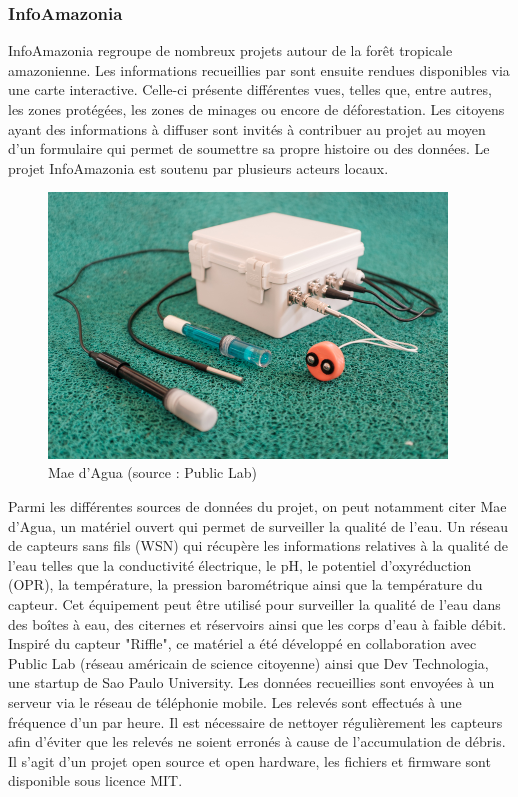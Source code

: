 \documentclass[10pt, article]{llncs}
\begin{document}
		\subsubsection{InfoAmazonia}
			InfoAmazonia regroupe de nombreux projets autour de la forêt tropicale amazonienne. Les informations recueillies par sont ensuite rendues disponibles via une carte interactive. Celle-ci présente différentes vues, telles que, entre autres, les zones protégées, les zones de minages ou encore de déforestation. Les citoyens ayant des informations à diffuser sont invités à contribuer au projet au moyen d'un formulaire qui permet de soumettre sa propre histoire ou des données. Le projet InfoAmazonia est soutenu par plusieurs acteurs locaux.\\
			\begin{figure}
				\begin{center}
					\includegraphics[width=300pt]{img/mae-dagua.jpg}
				\end{center}
				\caption{Mae d'Agua (source : Public Lab)}
			\end{figure}
			Parmi les différentes sources de données du projet, on peut notamment citer Mae d'Agua, un matériel ouvert qui permet de surveiller la qualité de l'eau. Un réseau de capteurs sans fils (WSN) qui récupère les informations relatives à la qualité de l'eau telles que la conductivité électrique, le pH, le potentiel d'oxyréduction (OPR), la température, la pression barométrique ainsi que la température du capteur. Cet équipement peut être utilisé pour surveiller la qualité de l'eau dans des boîtes à eau, des citernes et réservoirs ainsi que les corps d'eau à faible débit. Inspiré du capteur "Riffle", ce matériel a été développé en collaboration avec Public Lab (réseau américain de science citoyenne) ainsi que Dev Technologia, une startup de Sao Paulo University. Les données recueillies sont envoyées à un serveur via le réseau de téléphonie mobile. Les relevés sont effectués à une fréquence d'un par heure. Il est nécessaire de nettoyer régulièrement les capteurs afin d'éviter que les relevés ne soient erronés à cause de l'accumulation de débris. Il s'agit d'un projet open source et open hardware, les fichiers et firmware sont disponible sous licence MIT. \\
\end{document}

